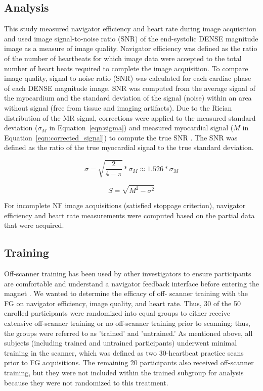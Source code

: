 \subsection{Analysis}
	This study measured navigator efficiency and heart rate during image acquisition and used image signal-to-noise ratio (SNR) of the end-systolic DENSE magnitude image as a measure of image quality. Navigator efficiency was defined as the ratio of the number of heartbeats for which image data were accepted to the total number of heart beats required to complete the image acquisition. To compare image quality, signal to noise ratio (SNR) was calculated for each cardiac phase of each DENSE magnitude image. SNR was computed from the average signal of the myocardium and the standard deviation of the signal (noise) within an area without signal (free from tissue and imaging artifacts). Due to the Rician distribution of the MR signal, corrections were applied to the measured standard deviation ($\sigma_M$ in Equation~\ref{eqn:sigma}) and measured myocardial signal ($M$ in Equation~\ref{eqn:corrected_signal}) to compute the true SNR \cite{Wehner2015,Wehner2015a,Gudbjartsson1995}. The SNR was defined as the ratio of the true myocardial signal to the true standard deviation.

\begin{equation}
	\label{eqn:sigma}
	\sigma = \sqrt{\frac{2}{4-\pi}}*\sigma_M \approx 1.526*\sigma_M
\end{equation}

\begin{equation}
	\label{eqn:corrected_signal}
	S= \sqrt{M^2-\sigma^2}
\end{equation}

	For incomplete NF image acquisitions (satisfied stoppage criterion), navigator efficiency and heart rate measurements were computed based on the partial data that were acquired.

\subsection{Training}
	Off-scanner training has been used by other investigators to ensure participants are comfortable and understand a navigator feedback interface before entering the magnet \cite{Feuerlein2009}. We wanted to determine the efficacy of off- scanner training with the FG on navigator efficiency, image quality, and heart rate. Thus, 30 of the 50 enrolled participants were randomized into equal groups to either receive extensive off-scanner training or no off-scanner training prior to scanning; thus, the groups were referred to as 'trained' and 'untrained.' As mentioned above, all subjects (including trained and untrained participants) underwent minimal training in the scanner, which was defined as two 30-heartbeat practice scans prior to FG acquisitions. The remaining 20 participants also received off-scanner training, but they were not included within the trained subgroup for analysis because they were not randomized to this treatment.
	
